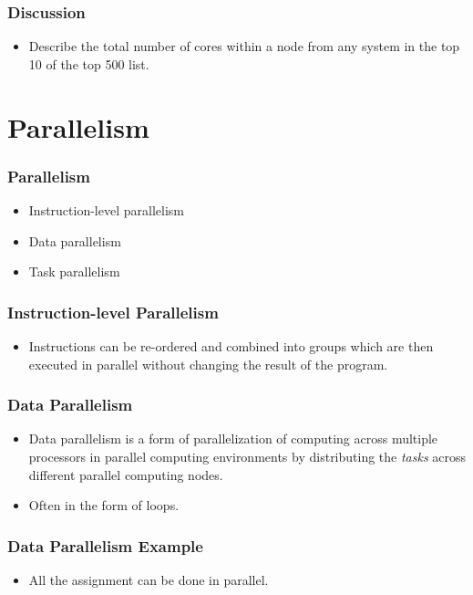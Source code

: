 \documentclass{beamer}
\begin{document}
\begin{CJK}{UTF8}{bsmi}
  \begin{frame}
    \frametitle{Discussion} 
    \begin{itemize}
    \item Describe the total number of cores within a node from any
      system in the top 10 of the top 500 list.
    \end{itemize}
  \end{frame}


  \section{Parallelism}

  \begin{frame}
    \frametitle{Parallelism} 
    \begin{itemize}
    \item Instruction-level parallelism
    \item Data parallelism
    \item Task parallelism
    \end{itemize}
  \end{frame}

  \begin{frame}
    \frametitle{Instruction-level Parallelism} 
    \begin{itemize}
    \item Instructions can be re-ordered and combined into groups which
      are then executed in parallel without changing the result of the
      program.
    \end{itemize}
  \end{frame}

  \begin{frame}
    \frametitle{Data Parallelism}
    \begin{itemize}
    \item Data parallelism is a form of parallelization of computing
      across multiple processors in parallel computing environments by
      distributing the {\em tasks} across different parallel computing
      nodes.
    \item Often in the form of loops.
    \end{itemize}
  \end{frame}

  \begin{frame}
    \frametitle{Data Parallelism Example}
    \begin{itemize}
    \item All the assignment can be done in parallel.
    \end{itemize}
  \end{frame}


\end{CJK}
\end{document}
